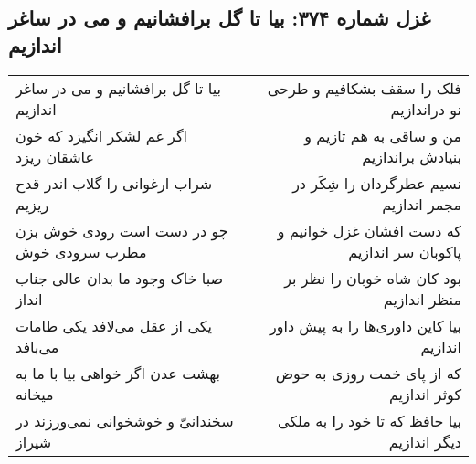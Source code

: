 \begin{center}
\section*{غزل شماره ۳۷۴: بیا تا گل برافشانیم و می در ساغر اندازیم}
\label{sec:sh374}
\begin{longtable}{l p{0.5cm} r}
بیا تا گل برافشانیم و می در ساغر اندازیم
&&
فلک را سقف بشکافیم و طرحی نو دراندازیم
\\
اگر غم لشکر انگیزد که خون عاشقان ریزد
&&
من و ساقی به هم تازیم و بنیادش براندازیم
\\
شراب ارغوانی را گلاب اندر قدح ریزیم
&&
نسیم عطرگردان را شِکَر در مجمر اندازیم
\\
چو در دست است رودی خوش بزن مطرب سرودی خوش
&&
که دست افشان غزل خوانیم و پاکوبان سر اندازیم
\\
صبا خاک وجود ما بدان عالی جناب انداز
&&
بود کان شاه خوبان را نظر بر منظر اندازیم
\\
یکی از عقل می‌لافد یکی طامات می‌بافد
&&
بیا کاین داوری‌ها را به پیش داور اندازیم
\\
بهشت عدن اگر خواهی بیا با ما به میخانه
&&
که از پای خمت روزی به حوض کوثر اندازیم
\\
سخندانیّ و خوشخوانی نمی‌ورزند در شیراز
&&
بیا حافظ که تا خود را به ملکی دیگر اندازیم
\\
\end{longtable}
\end{center}

